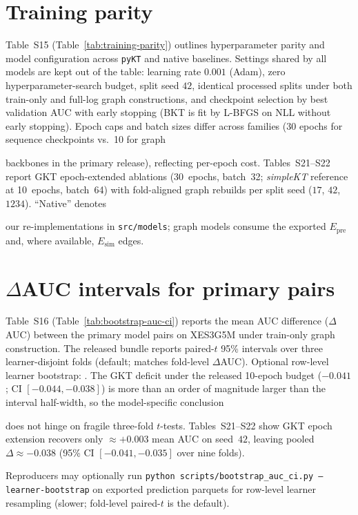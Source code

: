 \documentclass[pdflatex,sn-basic]{sn-jnl}
\newcommand{\rev}[1]{\begin{mdframed}[style=revhighlight]#1\end{mdframed}}
\newcommand{\Epre}{\ensuremath{E_{\text{pre}}}}
\newcommand{\Esim}{\ensuremath{E_{\text{sim}}}}
\begin{document}
\section{Training parity}
\label{sec:supp-training-parity}
Table~S15 (Table~\ref{tab:training-parity}) outlines hyperparameter parity
and model configuration across \texttt{pyKT} and native baselines. Settings
shared by all models are kept out of the table: learning rate $0.001$
(Adam), zero hyperparameter-search budget, split seed $42$, identical
processed splits under both train-only and full-log graph constructions, and
checkpoint selection by best validation AUC with early stopping (BKT is fit
by L-BFGS on NLL without early stopping). Epoch caps and batch sizes differ
across families (30 epochs for sequence checkpoints vs.\ 10 for graph
\rev{backbones in the primary release), reflecting per-epoch cost. Tables~S21--S22
report GKT epoch-extended ablations (30~epochs, batch~32; \textit{simpleKT}
reference at 10~epochs, batch~64) with fold-aligned graph rebuilds per split
seed ($17$, $42$, $1234$). ``Native'' denotes}
our re-implementations in \texttt{src/models}; graph models consume the
exported $\Epre$ and, where available, $\Esim$ edges.
\begin{table}[h!]
\centering
\caption{Training parity and hyperparameters (Table S15)}
\label{tab:training-parity}
{\small
}
\end{table}

\section{$\Delta$AUC intervals for primary pairs}
\label{sec:supp-bootstrap}
Table~S16 (Table~\ref{tab:bootstrap-auc-ci}) reports the mean AUC difference
($\Delta$AUC) between the primary model pairs on XES3G5M under train-only
graph construction. The released bundle reports paired-$t$ 95\% intervals
over three learner-disjoint folds (default; matches fold-level
$\Delta$AUC). Optional row-level learner bootstrap:
.
The GKT deficit under the released 10-epoch budget ($-0.041$; CI $[-0.044,-0.038]$) is more than an order of
magnitude larger than the interval half-width, so the model-specific conclusion
\rev{does not hinge on fragile three-fold $t$-tests. Tables~S21--S22 show GKT
epoch extension recovers only ${\approx}+0.003$ mean AUC on seed~$42$, leaving pooled
$\Delta{\approx}-0.038$ (95\% CI $[-0.041,-0.035]$ over nine folds).} Reproducers may optionally run
\texttt{python scripts/bootstrap\_auc\_ci.py --learner-bootstrap} on exported
prediction parquets for row-level learner resampling (slower; fold-level
paired-$t$ is the default).
\begin{table}[h!]
\centering
\caption{$\Delta$AUC intervals for primary pairs, XES3G5M, train-only graphs (Table S16)}
\label{tab:bootstrap-auc-ci}

\end{table}
\end{document}
